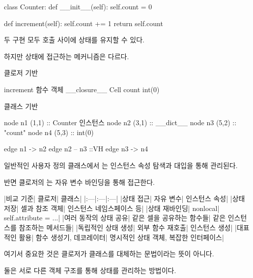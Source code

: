 \begin{dhkcode}
class Counter:
    def __init__(self):
        self.count = 0

    def increment(self):
        self.count += 1
        return self.count
\end{dhkcode}

두 구현 모두 호출 사이에 상태를 유지할 수 있다.

하지만 상태에 접근하는 메커니즘은 다르다.

\begin{dhknote}
\begin{dhksmry}[centered]
클로저 기반
\end{dhksmry}
\end{dhknote}

\begin{dhksmry}[centered]
increment 함수 객체
\da
__closure__
\da
Cell count
\da
int(0)
\end{dhksmry}

\begin{dhknote}
\begin{dhksmry}[centered]
클래스 기반
\end{dhksmry}
\end{dhknote}

\begin{dhkdiagram}[in=6]
node n1 (1,1) :: Counter 인스턴스
node n2 (3,1) :: __dict__
node n3 (5,2) :: "count"
node n4 (5,3) :: int(0)

edge n1 -> n2
edge n2 -- n3 ::VH
edge n3 -> n4
\end{dhkdiagram}

일반적인 사용자 정의 클래스에서 는 인스턴스 속성 탐색과 대입을 통해 관리된다.

반면 클로저의 는 자유 변수 바인딩을 통해 접근한다.

\begin{dhktable}
|비교 기준|	클로저|	클래스|
|:---|:---|:---|
|상태 접근|	자유 변수|	인스턴스 속성|
|상태 저장|	셀과 참조 객체|	인스턴스 네임스페이스 등|
|상태 재바인딩|	nonlocal|	self.attribute = ...|
|여러 동작의 상태 공유|	같은 셀을 공유하는 함수들|	같은 인스턴스를 참조하는 메서드들|
|독립적인 상태 생성|	외부 함수 재호출|	인스턴스 생성|
|대표적인 활용|	함수 생성기, 데코레이터|	명시적인 상태 객체, 복잡한 인터페이스|
\end{dhktable}

여기서 중요한 것은 클로저가 클래스를 대체하는 문법이라는 뜻이 아니다.

둘은 서로 다른 객체 구조를 통해 상태를 관리하는 방법이다.

